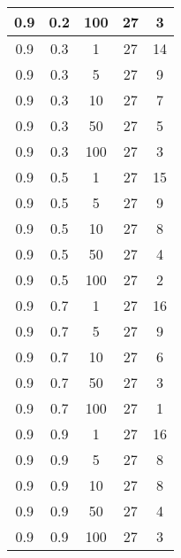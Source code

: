\begin{appendices}
\begin{longtable}{|c|c|c|c|c|}
		0.9 & 0.2 & 100 & 27 & 3  \\ \hline
		0.9 & 0.3 & 1   & 27 & 14 \\
		0.9 & 0.3 & 5   & 27 & 9  \\
		0.9 & 0.3 & 10  & 27 & 7  \\
		0.9 & 0.3 & 50  & 27 & 5  \\
		0.9 & 0.3 & 100 & 27 & 3  \\ \hline
		0.9 & 0.5 & 1   & 27 & 15 \\
		0.9 & 0.5 & 5   & 27 & 9  \\
		0.9 & 0.5 & 10  & 27 & 8  \\
		0.9 & 0.5 & 50  & 27 & 4  \\
		0.9 & 0.5 & 100 & 27 & 2  \\ \hline
		0.9 & 0.7 & 1   & 27 & 16 \\
		0.9 & 0.7 & 5   & 27 & 9  \\
		0.9 & 0.7 & 10  & 27 & 6  \\
		0.9 & 0.7 & 50  & 27 & 3  \\
		0.9 & 0.7 & 100 & 27 & 1  \\ \hline
		0.9 & 0.9 & 1   & 27 & 16 \\
		0.9 & 0.9 & 5   & 27 & 8  \\
		0.9 & 0.9 & 10  & 27 & 8  \\
		0.9 & 0.9 & 50  & 27 & 4  \\
		0.9 & 0.9 & 100 & 27 & 3 \\ \hline
	\end{longtable}
\end{appendices}
